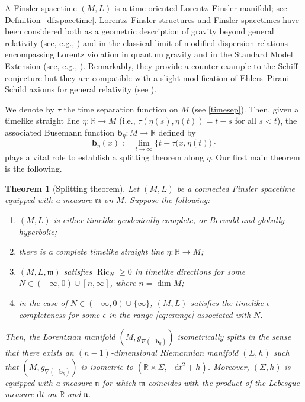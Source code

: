 \documentclass[a4paper,11pt]{article}
\numberwithin{equation}{section}
\theoremstyle{definition}
\theoremstyle{plain}
\newtheorem{theorem}[definition]{Theorem}
\newcommand{\ez}{\epsilon}
\newcommand{\lra}{\longrightarrow}
\newcommand{\dd}{\mathrm{d}}
\newcommand{\R}{\ensuremath{\mathbb{R}}}
\newcommand{\fm}{\ensuremath{\mathfrak{m}}}
\newcommand{\fn}{\ensuremath{\mathfrak{n}}}
\newcommand{\bb}{\ensuremath{\mathbf{b}}}
\def\Ric{\mathop{\mathrm{Ric}}\nolimits}
\begin{document}
A Finsler spacetime $(M,L)$ is a time oriented Lorentz--Finsler manifold; see Definition~\ref{df:spacetime}. Lorentz--Finsler structures and Finsler spacetimes have been considered both as a 
geometric description of gravity beyond general relativity (see, e.g., \cite{KoStSt09, Pfeife19, BeJaSa20}) and in the classical limit of modified dispersion relations
encompassing Lorentz violation in quantum gravity and in the Standard Model Extension (see, e.g., \cite{GiLiSi06, Vacaru11, Kostel11, KoRuTs12, Russel15, Collad17}). Remarkably, they provide a counter-example to the Schiff conjecture \cite{LaPeHa12} but they are compatible with a slight modification of Ehlers--Pirani--Schild axioms for general relativity (see \cite{LaePer18, BeJaSa20}).

We denote by $\tau$ the time separation function on $M$ (see \eqref{timesep}).
Then, given a timelike straight line $\eta\colon \R \lra M$ (i.e., $\tau(\eta(s),\eta(t))=t-s$ for all $s<t$), the associated Busemann function $\bb_\eta \colon M \lra \R$ defined by
\[ \bb_\eta(x) :=\lim_{t \to \infty} \bigl\{ t-\tau\bigl( x,\eta(t) \bigr) \bigr\} \]
plays a vital role to establish a splitting theorem along $\eta$.
Our first main theorem is the following.

\begin{theorem}[Splitting theorem]\label{th:LFsplit}
Let $(M,L)$ be a connected Finsler spacetime equipped with a measure $\fm$ on $M$.
Suppose the following:
\begin{enumerate}[{\rm (1)}]
\item\label{it:split1}
$(M,L)$ is either timelike geodesically complete, or Berwald and globally hyperbolic;
\item\label{it:split2}
there is a complete timelike straight line $\eta\colon \R \lra M$;
\item\label{it:split3}
$(M,L,\fm)$ satisfies $\Ric_N \ge 0$ in timelike directions for some $N \in (-\infty,0) \cup [n,\infty]$, where $n=\dim M$;
\item\label{it:split4}
in the case of $N \in (-\infty,0) \cup \{\infty\}$,
$(M,L)$ satisfies the timelike $\ez$-completeness for some $\ez$ in the range \eqref{eq:erange} associated with $N$.
\end{enumerate}
Then, the Lorentzian manifold $(M,g_{\nabla(-\bb_{\eta})})$ isometrically splits
in the sense that there exists an $(n-1)$-dimensional Riemannian manifold $(\Sigma,h)$
such that $(M,g_{\nabla(-\bb_{\eta})})$ is isometric to $(\R \times \Sigma,-\dd t^2 +h)$.
%
Moreover, $(\Sigma,h)$ is equipped with a measure $\fn$ for which
$\fm$ coincides with the product of the Lebesgue measure $\dd t$ on $\R$ and $\fn$.
\end{theorem}
\end{document}
